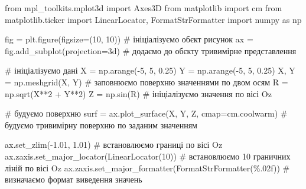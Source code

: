 \documentclass[
  letterpaper,
]{report}
\newenvironment{Shaded}{\begin{snugshade}}{\end{snugshade}}
\newcommand{\CommentTok}[1]{\textcolor[rgb]{0.37,0.37,0.37}{#1}}
\newcommand{\DecValTok}[1]{\textcolor[rgb]{0.68,0.00,0.00}{#1}}
\newcommand{\FloatTok}[1]{\textcolor[rgb]{0.68,0.00,0.00}{#1}}
\newcommand{\ImportTok}[1]{\textcolor[rgb]{0.00,0.46,0.62}{#1}}
\newcommand{\NormalTok}[1]{\textcolor[rgb]{0.00,0.23,0.31}{#1}}
\newcommand{\OperatorTok}[1]{\textcolor[rgb]{0.37,0.37,0.37}{#1}}
\newcommand{\StringTok}[1]{\textcolor[rgb]{0.13,0.47,0.30}{#1}}
\begin{document}
\begin{Shaded}
\begin{Highlighting}[]
\ImportTok{from}\NormalTok{ mpl\_toolkits.mplot3d }\ImportTok{import}\NormalTok{ Axes3D}
\ImportTok{from}\NormalTok{ matplotlib }\ImportTok{import}\NormalTok{ cm}
\ImportTok{from}\NormalTok{ matplotlib.ticker }\ImportTok{import}\NormalTok{ LinearLocator, FormatStrFormatter}
\ImportTok{import}\NormalTok{ numpy }\ImportTok{as}\NormalTok{ np}


\NormalTok{fig }\OperatorTok{=}\NormalTok{ plt.figure(figsize}\OperatorTok{=}\NormalTok{(}\DecValTok{10}\NormalTok{, }\DecValTok{10}\NormalTok{)) }\CommentTok{\# ініціалізуємо об\textquotesingle{}єкт рисунок}
\NormalTok{ax }\OperatorTok{=}\NormalTok{ fig.add\_subplot(projection}\OperatorTok{=}\StringTok{\textquotesingle{}3d\textquotesingle{}}\NormalTok{) }\CommentTok{\# додаємо до об\textquotesingle{}єкту тривимірне представлення}

\CommentTok{\# ініціалізуємо дані}
\NormalTok{X }\OperatorTok{=}\NormalTok{ np.arange(}\OperatorTok{{-}}\DecValTok{5}\NormalTok{, }\DecValTok{5}\NormalTok{, }\FloatTok{0.25}\NormalTok{)}
\NormalTok{Y }\OperatorTok{=}\NormalTok{ np.arange(}\OperatorTok{{-}}\DecValTok{5}\NormalTok{, }\DecValTok{5}\NormalTok{, }\FloatTok{0.25}\NormalTok{)}
\NormalTok{X, Y }\OperatorTok{=}\NormalTok{ np.meshgrid(X, Y) }\CommentTok{\# заповнюємо поверхню значеннями по двом осям}
\NormalTok{R }\OperatorTok{=}\NormalTok{ np.sqrt(X}\OperatorTok{**}\DecValTok{2} \OperatorTok{+}\NormalTok{ Y}\OperatorTok{**}\DecValTok{2}\NormalTok{)}
\NormalTok{Z }\OperatorTok{=}\NormalTok{ np.sin(R) }\CommentTok{\# ініціалізуємо значення по вісі Oz}

\CommentTok{\# будуємо поверхню}
\NormalTok{surf }\OperatorTok{=}\NormalTok{ ax.plot\_surface(X, Y, Z, cmap}\OperatorTok{=}\NormalTok{cm.coolwarm) }\CommentTok{\# будуємо тривимірну поверхню по заданим значенням}


\NormalTok{ax.set\_zlim(}\OperatorTok{{-}}\FloatTok{1.01}\NormalTok{, }\FloatTok{1.01}\NormalTok{) }\CommentTok{\# встановлюємо границі по вісі Oz}
\NormalTok{ax.zaxis.set\_major\_locator(LinearLocator(}\DecValTok{10}\NormalTok{)) }\CommentTok{\# встановлюємо 10 граничних ліній по вісі Oz}
\NormalTok{ax.zaxis.set\_major\_formatter(FormatStrFormatter(}\StringTok{\textquotesingle{}\%.02f\textquotesingle{}}\NormalTok{)) }\CommentTok{\# визначаємо формат виведення значень}
\end{Highlighting}
\end{Shaded}
\end{document}
